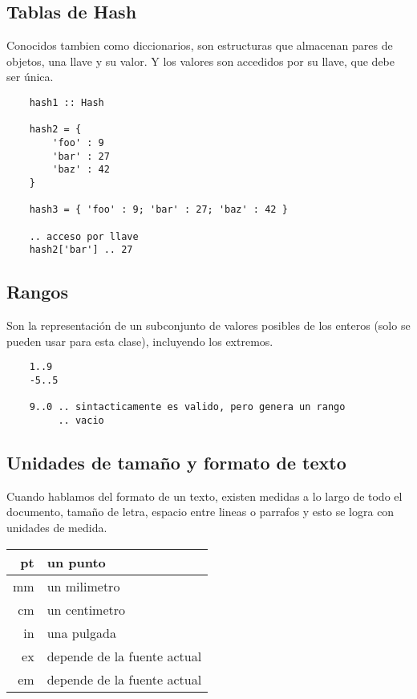 \documentclass[12pt,letterpaper,titlepage,oneside,openright]{book}
\begin{document}
\subsection{Tablas de Hash}

Conocidos tambien como diccionarios, son estructuras que almacenan pares de objetos, una llave y su valor. Y los valores son accedidos por su llave, que debe ser única.

\begin{center}
\begin{minipage}{\linewidth}
\begin{lstlisting}
    hash1 :: Hash

    hash2 = {
        'foo' : 9
        'bar' : 27
        'baz' : 42
    }

    hash3 = { 'foo' : 9; 'bar' : 27; 'baz' : 42 }

    .. acceso por llave
    hash2['bar'] .. 27
\end{lstlisting}
\end{minipage}
\end{center}

\subsection{Rangos}

Son la representación de un subconjunto de valores posibles de los enteros (solo se pueden usar para esta clase), incluyendo los extremos.

\begin{center}
\begin{minipage}{\linewidth}
\begin{lstlisting}
    1..9
    -5..5

    9..0 .. sintacticamente es valido, pero genera un rango
         .. vacio
\end{lstlisting}
\end{minipage}
\end{center}

\subsection{Unidades de tamaño y formato de texto}

Cuando hablamos del formato de un texto, existen medidas a lo largo de todo el documento, tamaño de letra, espacio entre lineas o parrafos y esto se logra con unidades de medida.

\begin{tabular}{ r | l}
pt & un punto \\
\hline
mm & un milimetro  \\
\hline
cm & un centimetro  \\
\hline
in & una pulgada \\
\hline
ex & depende de la fuente actual \\
\hline
em & depende de la fuente actual \\
\hline
\end{tabular}
\end{document}
